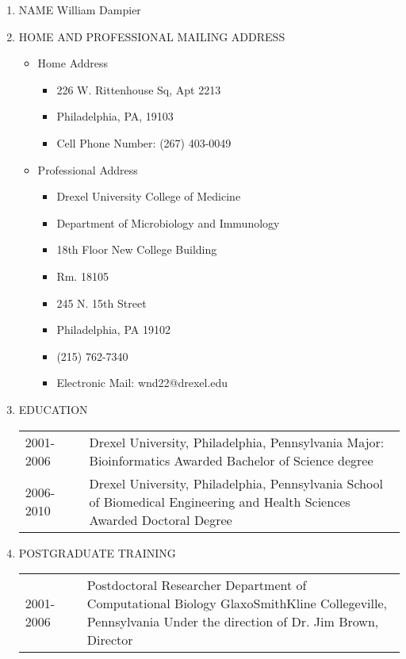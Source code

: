 \documentclass[a4paper,10pt]{article}
\title{}
\author{Will Dampier}
\date{}
\begin{document}
\begin{enumerate}
 \item NAME \newline
 William Dampier
 \item HOME AND PROFESSIONAL MAILING ADDRESS
 \begin{itemize}
  \item[] Home Address
  \begin{itemize}
   \item[] 226 W. Rittenhouse Sq, Apt 2213
   \item[] Philadelphia, PA, 19103
   \item[] Cell Phone Number: (267) 403-0049
  \end{itemize}
  \item[] Professional Address
  \begin{itemize}
   \item[] Drexel University College of Medicine
   \item[] Department of Microbiology and Immunology
   \item[] 18th Floor New College Building
   \item[] Rm. 18105
   \item[] 245 N. 15th Street
   \item[] Philadelphia, PA 19102
   \item[] (215) 762-7340
   \item[] Electronic Mail:  wnd22@drexel.edu
  \end{itemize}
 \end{itemize}
 \item EDUCATION
 \begin{longtable}{p{}p{}p{}}
  2001-2006 & & Drexel University, Philadelphia, Pennsylvania \newline Major: Bioinformatics \newline Awarded Bachelor of Science degree \\
  2006-2010 & & Drexel University, Philadelphia, Pennsylvania \newline School of Biomedical Engineering and Health Sciences \newline Awarded Doctoral Degree \\
 \end{longtable}
 \item POSTGRADUATE TRAINING
 \begin{longtable}{p{}p{}p{}}
  2001-2006 & & Postdoctoral Researcher \newline Department of Computational Biology \newline GlaxoSmithKline Collegeville, Pennsylvania \newline Under the direction of Dr. Jim Brown, Director \\

\end{longtable}
\end{enumerate}
\end{document}
